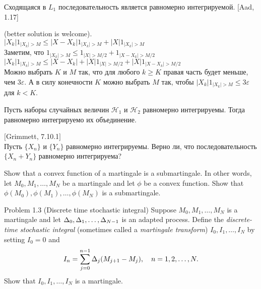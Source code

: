 \begin{problem}
Сходящаяся в $L_{1}$ последовательность является равномерно
интегрируемой. [Aad, 1.17]

\begin{sol}

(better solution is welcome). \\
$|X_{k}|1_{|X_{k}|>M}\le |X-X_{k}|1_{|X_{k}|>M}+|X|1_{|X_{k}|>M}$
\\
Заметим, что $1_{|X_{k}|>M}\le 1_{|X|>M/2}+1_{|X-X_{k}|>M/2}$ \\
$|X_{k}|1_{|X_{k}|>M}\le
|X-X_{k}|+|X|1_{|X|>M/2}+|X|1_{|X-X_{k}|>M/2}$ \\
Можно выбрать $K$ и $M$ так, что для любого $k\ge K$ правая часть
будет меньше, чем $3\varepsilon$. А в силу конечности $K$ можно
выбрать $M$ так, чтобы $|X_{k}|1_{|X_{k}|>M}\le 3\varepsilon$ для
$k<K$.
\end{sol}
\end{problem}

\begin{problem}
Пусть наборы случайных величин $\mathcal{H}_{1}$ и
$\mathcal{H}_{2}$ равномерно интегрируемы.
Тогда равномерно интегрируемо их объединение.

\begin{sol}

\end{sol}
\end{problem}

\begin{problem}
 $[$Grimmett, 7.10.1$]$\\
 Пусть $\{X_{n}\}$ и $\{Y_{n}\}$ равномерно
интегрируемы. Верно ли, что последовательность $\{X_{n}+Y_{n}\}$
равномерно интегрируема?

\begin{sol}

\end{sol}
\end{problem}

\begin{problem}
 Show that a convex function of a martingale is a submartingale.
In other words, let $M_0,M_1,\dots,M_N$ be a martingale and let $\phi$ be a convex function.
Show that $\phi(M_0),\phi(M_1),\dots,\phi(M_N)$ is a submartingale.

\begin{sol}

\end{sol}
\end{problem}

\begin{problem}
Problem 1.3 (Discrete time stochastic integral) Suppose $M_0,M_1,\dots,M_N$
is a martingale and let $\Delta_0,\Delta_1,\dots,\Delta_{N-1}$ is an adapted process. Define the
\emph{discrete-time stochastic integral} (sometimes called a \emph{martingale transform})
$I_0,I_1,\dots,I_N$ by setting $I_0=0$ and
\[
I_n=\sum\limits_{j=0}^{n-1} \Delta_j (M_{j+1}-M_j),\quad n=1,2,\dots,N.
\]
\ni Show that $I_0,I_1,\dots,I_N$ is a martingale.

\begin{sol}

\end{sol}
\end{problem}

